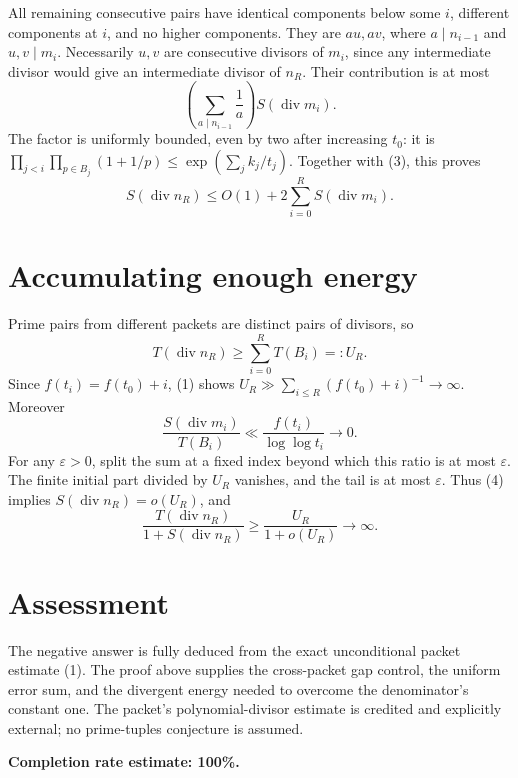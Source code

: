 \documentclass[11pt]{article}
\begin{document}
All remaining consecutive pairs have identical components below some $i$, different components at $i$, and no higher components. They are $au,av$, where $a\mid n_{i-1}$ and $u,v\mid m_i$. Necessarily $u,v$ are consecutive divisors of $m_i$, since any intermediate divisor would give an intermediate divisor of $n_R$. Their contribution is at most
\[
 \left(\sum_{a\mid n_{i-1}}\frac1a\right)S(\operatorname{div}m_i).
\]
The factor is uniformly bounded, even by two after increasing $t_0$: it is
$\prod_{j<i}\prod_{p\in B_j}(1+1/p)\le\exp(\sum_j k_j/t_j)$.
Together with (3), this proves
\[
 S(\operatorname{div}n_R)\le O(1)+2\sum_{i=0}^R S(\operatorname{div}m_i).\tag{4}
\]

\section*{Accumulating enough energy}
Prime pairs from different packets are distinct pairs of divisors, so
\[
 T(\operatorname{div}n_R)\ge\sum_{i=0}^R T(B_i)=:U_R.
\]
Since $f(t_i)=f(t_0)+i$, (1) shows $U_R\gg\sum_{i\le R}(f(t_0)+i)^{-1}\to\infty$. Moreover
\[
 \frac{S(\operatorname{div}m_i)}{T(B_i)}
 \ll\frac{f(t_i)}{\log\log t_i}\longrightarrow0.
\]
For any $\varepsilon>0$, split the sum at a fixed index beyond which this ratio is at most $\varepsilon$. The finite initial part divided by $U_R$ vanishes, and the tail is at most $\varepsilon$. Thus (4) implies $S(\operatorname{div}n_R)=o(U_R)$, and
\[
 \frac{T(\operatorname{div}n_R)}{1+S(\operatorname{div}n_R)}\ge
 \frac{U_R}{1+o(U_R)}\longrightarrow\infty.
\]

\section*{Assessment}
The negative answer is fully deduced from the exact unconditional packet estimate (1). The proof above supplies the cross-packet gap control, the uniform error sum, and the divergent energy needed to overcome the denominator's constant one. The packet's polynomial-divisor estimate is credited and explicitly external; no prime-tuples conjecture is assumed.

\textbf{Completion rate estimate: 100\%.}
\end{document}
